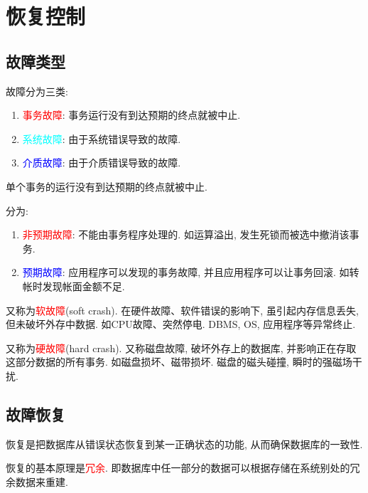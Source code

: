 \chapter{恢复控制}

\section{故障类型}

故障分为三类:
\begin{enumerate}
    \item \textcolor{red}{事务故障}: 事务运行没有到达预期的终点就被中止.
    \item \textcolor{cyan}{系统故障}: 由于系统错误导致的故障.
    \item \textcolor{blue}{介质故障}: 由于介质错误导致的故障.
\end{enumerate}

\begin{definition}[事务故障]
单个事务的运行没有到达预期的终点就被中止.

分为:
\begin{enumerate}
    \item \textcolor{red}{非预期故障}: 不能由事务程序处理的. 如运算溢出, 发生死锁而被选中撤消该事务.
    \item \textcolor{blue}{预期故障}: 应用程序可以发现的事务故障, 并且应用程序可以让事务回滚. 如转帐时发现帐面金额不足.
\end{enumerate}
\end{definition}

\begin{definition}[系统故障]
又称为\textcolor{red}{软故障}(soft crash). 在硬件故障、软件错误的影响下, 虽引起内存信息丢失, 但未破坏外存中数据.
如CPU故障、突然停电. DBMS, OS, 应用程序等异常终止.
\end{definition}

\begin{definition}[介质故障]
又称为\textcolor{red}{硬故障}(hard crash). 又称磁盘故障, 破坏外存上的数据库, 并影响正在存取这部分数据的所有事务.
如磁盘损坏、磁带损坏. 磁盘的磁头碰撞, 瞬时的强磁场干扰.
\end{definition}

\section{故障恢复}

\begin{definition}[恢复]
恢复是把数据库从错误状态恢复到某一正确状态的功能, 从而确保数据库的一致性.

恢复的基本原理是\textcolor{red}{冗余}. 即数据库中任一部分的数据可以根据存储在系统别处的冗余数据来重建.
\end{definition}

